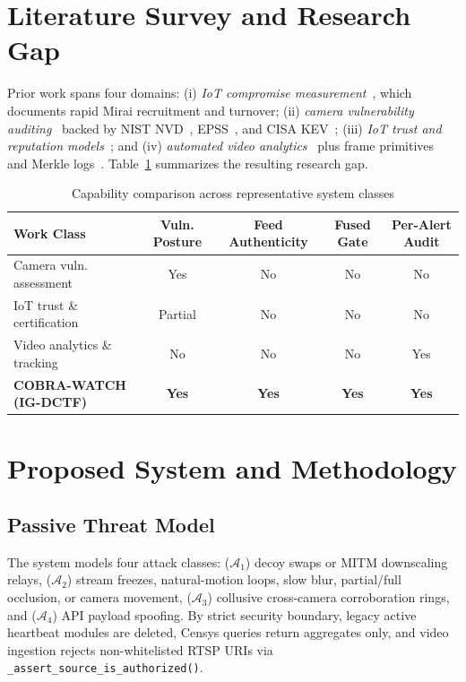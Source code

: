 \documentclass[12pt,a4paper]{article}
\begin{document}
\section{Literature Survey and Research Gap}
Prior work spans four domains: (i) \emph{IoT compromise measurement}~\cite{antonakakis2017mirai,griffioen2020mirai,zhang2020forensics,famera2025mirai,matherly2015shodan}, which documents rapid Mirai recruitment and turnover; (ii) \emph{camera vulnerability auditing}~\cite{bernot2025cctv,oliver2025ipcam,kth2018cameras,auti2025vapt} backed by NIST NVD~\cite{nvd}, EPSS~\cite{jacobs2021epss}, and CISA KEV~\cite{cisakev}; (iii) \emph{IoT trust and reputation models}~\cite{ferraris2024trust,iottrust2023slr,biot2026trust,swami2025sciiot,kipf2017gcn}; and (iv) \emph{automated video analytics}~\cite{jocher2023yolov8,zhang2022bytetrack,luna2018aod,nayak2019loitering,yilmazer2025abandoned,rasal2025suspicious,liu2025epipolar} plus frame primitives~\cite{zauner2010phash,pech2000focus} and Merkle logs~\cite{merkle1987}. Table~\ref{tab:lit_gap} summarizes the resulting research gap.

\begin{table}[!ht]
  \centering
  \caption{Capability comparison across representative system classes}
  \label{tab:lit_gap}
  \begin{tabular}{@{}lcccc@{}}
    \toprule
    \textbf{Work Class} & \textbf{Vuln. Posture} & \textbf{Feed Authenticity} & \textbf{Fused Gate} & \textbf{Per-Alert Audit} \\
    \midrule
    Camera vuln. assessment~\cite{bernot2025cctv,oliver2025ipcam,auti2025vapt} & Yes & No & No & No \\
    IoT trust \& certification~\cite{swami2025sciiot,ferraris2024trust,biot2026trust} & Partial & No & No & No \\
    Video analytics \& tracking~\cite{jocher2023yolov8,zhang2022bytetrack,nayak2019loitering} & No & No & No & Yes \\
    \textbf{COBRA-WATCH (IG-DCTF)} & \textbf{Yes} & \textbf{Yes} & \textbf{Yes} & \textbf{Yes} \\
    \bottomrule
  \end{tabular}
\end{table}

\section{Proposed System and Methodology}

\subsection{Passive Threat Model}
The system models four attack classes: ($\mathcal{A}_1$) decoy swaps or MITM downscaling relays, ($\mathcal{A}_2$) stream freezes, natural-motion loops, slow blur, partial/full occlusion, or camera movement, ($\mathcal{A}_3$) collusive cross-camera corroboration rings, and ($\mathcal{A}_4$) API payload spoofing. By strict security boundary, legacy active heartbeat modules are deleted, Censys queries return aggregates only, and video ingestion rejects non-whitelisted RTSP URIs via \texttt{\_assert\_source\_is\_authorized()}.
\end{document}
